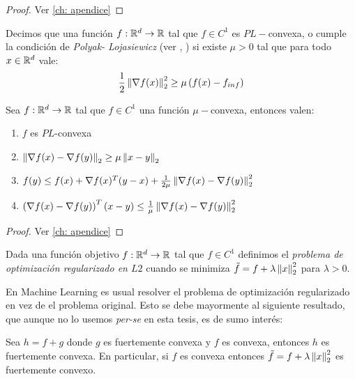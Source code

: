 \begin{proof}
	Ver \ref{ch: apendice}
\end{proof}

\begin{definition}
	\label{def: Condicion PL}
	Decimos que una funci\'on $f:{\mathbb{R}}^d \rightarrow {\mathbb{R}}$ tal que $f \in C^1$ es $PL-$convexa, o cumple la condici\'on de \textit{Polyak- Lojasiewicz} (ver \cite{polyak:1963}, \cite{lojasiewicz:1963}) si existe $\mu >0$ tal que para todo $x \in {\mathbb{R}}^d$ vale:
	\begin{equation}
	\frac{1}{2} \left\lVert\nabla f(x)\right\rVert^2_2 \geq \mu \left(f(x) - f_{inf}\right)
	\end{equation}
\end{definition}

\begin{proposition}
	\label{prop: implicancias de convexidad fuerte}
	Sea $f:{\mathbb{R}}^d \rightarrow {\mathbb{R}}$ tal que $f \in C^1$ una funci\'on $\mu-$convexa, entonces valen:
	\begin{enumerate}
		\item $f$ es $PL$-convexa
		\item $\left\lVert\nabla f(x) - \nabla f(y)\right\rVert_2 \geq \mu \left\lVert x-y\right\rVert_2$
		\item $f(y) \leq f(x) + \nabla f(x)^T (y-x) + \frac{1}{2 \mu} \left\lVert\nabla f(x) - \nabla f(y)\right\rVert_2^2$
		\item $ \left(\nabla f(x) - \nabla f(y)\right)^T (x-y) \leq \frac{1}{\mu} \left\lVert\nabla f(x) - \nabla f(y)\right\rVert_2^2$
	\end{enumerate}
\end{proposition}

\begin{proof}
	Ver \ref{ch: apendice}
\end{proof}

\begin{definition}
	Dada una funci\'on objetivo $f:{\mathbb{R}}^d \rightarrow {\mathbb{R}}$ tal que $f \in C^1$ definimos el \textit{problema de optimizaci\'on regularizado en $L2$} cuando se minimiza $\tilde{f} = f + \lambda \left\lVert x\right\rVert_2^2$ para $\lambda >0$.
\end{definition}

En Machine Learning es usual resolver el problema de optimizaci\'on regularizado en vez de el problema original. Esto se debe mayormente al siguiente resultado, que aunque no lo usemos \textit{per-se} en esta tesis, es de sumo inter\'es:

\begin{corollary}
	\label{coro: convexa y fuertemente convexa es fuertemente convexa}
	Sea $h = f+g$ donde $g$ es fuertemente convexa y $f$ es convexa, entonces $h$ es fuertemente convexa. En particular, si $f$ es convexa entonces $\tilde{f} = f + \lambda \left\lVert x\right\rVert_2^2$ es fuertemente convexo.
\end{corollary}

